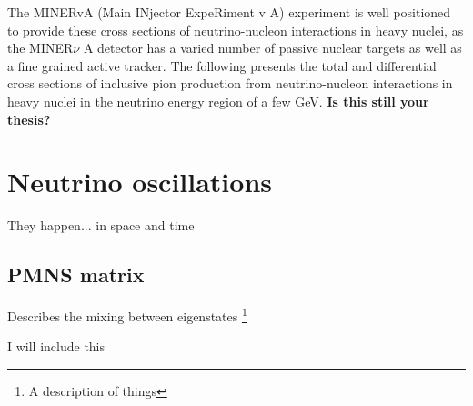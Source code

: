 \documentclass[../main.tex]{subfiles}
\begin{document}
The MINERvA (Main INjector ExpeRiment v A) experiment is well positioned to provide these cross sections of neutrino-nucleon interactions in heavy nuclei, as the MINER$\nu$ A detector has a varied number of passive nuclear targets as well as a fine grained active tracker.  The following presents the total and differential cross sections of inclusive pion production from neutrino-nucleon interactions in heavy nuclei in the neutrino energy region of a few GeV. \textbf{Is this still your thesis?}
\section{Neutrino oscillations}
They happen... in space and time

\subsection{PMNS matrix}
Describes the mixing between eigenstates \footnote{A description of
things}

I will include this\cite{lamport94}

%
\end{document}
